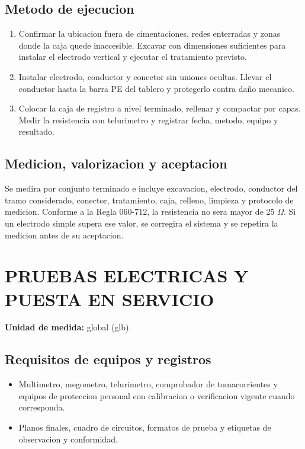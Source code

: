 \subsection{Metodo de ejecucion}
\begin{enumerate}
  \item Confirmar la ubicacion fuera de cimentaciones, redes enterradas y zonas donde
  la caja quede inaccesible. Excavar con dimensiones suficientes para instalar el
  electrodo vertical y ejecutar el tratamiento previsto.
  \item Instalar electrodo, conductor y conector sin uniones ocultas. Llevar el
  conductor hasta la barra PE del tablero y protegerlo contra daño mecanico.
  \item Colocar la caja de registro a nivel terminado, rellenar y compactar por capas.
  Medir la resistencia con telurimetro y registrar fecha, metodo, equipo y resultado.
\end{enumerate}

\subsection{Medicion, valorizacion y aceptacion}
Se medira por conjunto terminado e incluye excavacion, electrodo, conductor del tramo
considerado, conector, tratamiento, caja, relleno, limpieza y protocolo de medicion.
Conforme a la Regla 060-712, la resistencia no sera mayor de 25 \(\Omega\). Si un
electrodo simple supera ese valor, se corregira el sistema y se repetira la medicion
antes de su aceptacion.

\section{PRUEBAS ELECTRICAS Y PUESTA EN SERVICIO}

\textbf{Unidad de medida:} global (glb).

\subsection{Requisitos de equipos y registros}
\begin{itemize}
  \item Multimetro, megometro, telurimetro, comprobador de tomacorrientes y equipos de
  proteccion personal con calibracion o verificacion vigente cuando corresponda.
  \item Planos finales, cuadro de circuitos, formatos de prueba y etiquetas de
  observacion y conformidad.
\end{itemize}

